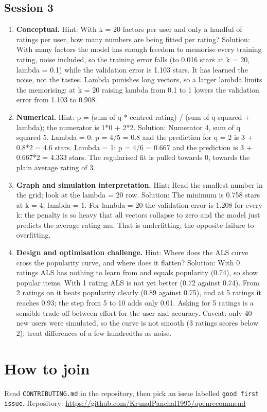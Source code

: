\documentclass[11pt,a4paper]{article}
\begin{document}
\subsection*{Session 3}
\begin{enumerate}[nosep]
\item \textbf{Conceptual.} Hint: With k = 20 factors per user and only a handful of ratings per user, how many numbers are being fitted per rating? Solution: With many factors the model has enough freedom to memorise every training rating, noise included, so the training error falls (to 0.016 stars at k = 20, lambda = 0.1) while the validation error is 1.103 stars. It has learned the noise, not the tastes. Lambda punishes long vectors, so a larger lambda limits the memorising: at k = 20 raising lambda from 0.1 to 1 lowers the validation error from 1.103 to 0.908.
\item \textbf{Numerical.} Hint: p = (sum of q * centred rating) / (sum of q squared + lambda); the numerator is 1*0 + 2*2. Solution: Numerator 4, sum of q squared 5. Lambda = 0: p = 4/5 = 0.8 and the prediction for q = 2 is 3 + 0.8*2 = 4.6 stars. Lambda = 1: p = 4/6 = 0.667 and the prediction is 3 + 0.667*2 = 4.333 stars. The regularised fit is pulled towards 0, towards the plain average rating of 3.
\item \textbf{Graph and simulation interpretation.} Hint: Read the smallest number in the grid; look at the lambda = 20 row. Solution: The minimum is 0.758 stars at k = 4, lambda = 1. For lambda = 20 the validation error is 1.208 for every k: the penalty is so heavy that all vectors collapse to zero and the model just predicts the average rating mu. That is underfitting, the opposite failure to overfitting.
\item \textbf{Design and optimisation challenge.} Hint: Where does the ALS curve cross the popularity curve, and where does it flatten? Solution: With 0 ratings ALS has nothing to learn from and equals popularity (0.74), so show popular items. With 1 rating ALS is not yet better (0.72 against 0.74). From 2 ratings on it beats popularity clearly (0.89 against 0.75), and at 5 ratings it reaches 0.93; the step from 5 to 10 adds only 0.01. Asking for 5 ratings is a sensible trade-off between effort for the user and accuracy. Caveat: only 40 new users were simulated, so the curve is not smooth (3 ratings scores below 2); treat differences of a few hundredths as noise.
\end{enumerate}

\section{How to join}
Read \texttt{CONTRIBUTING.md} in the repository, then pick an issue labelled \texttt{good first issue}. Repository: \url{https://github.com/KrunalPanchal1995/openrecommend}
\end{document}
